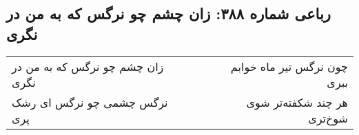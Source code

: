 \begin{center}
\section*{رباعی شماره ۳۸۸: زان چشم چو نرگس که به من در نگری}
\label{sec:sh388}
\begin{longtable}{l p{0.5cm} r}
زان چشم چو نرگس که به من در نگری
&&
چون نرگس تیر ماه خوابم ببری
\\
نرگس چشمی چو نرگس ای رشک پری
&&
هر چند شکفته‌تر شوی شوخ‌تری
\\
\end{longtable}
\end{center}
